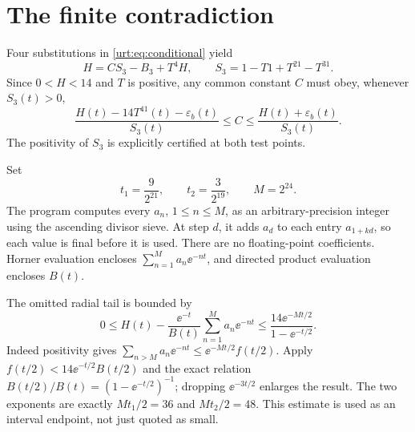 \documentclass[11pt,letterpaper]{article}
\theoremstyle{remark}\newtheorem{remark}[theorem]{Remark}
\begin{document}
\section{The finite contradiction}\label{urt:sec:contradiction}
Four substitutions in \eqref{urt:eq:conditional} yield
\begin{equation}\label{urt:eq:iterated}
 H=CS_3-B_3+T^4H,\qquad S_3=1-T1+T^21-T^31.
\end{equation}
Since $0<H<14$ and $T$ is positive, any common constant $C$ must obey, whenever $S_3(t)>0$,
\begin{equation}\label{urt:eq:Cinterval}
 \frac{H(t)-14T^41(t)-\varepsilon_b(t)}{S_3(t)}
 \le C\le
 \frac{H(t)+\varepsilon_b(t)}{S_3(t)}.
\end{equation}
The positivity of $S_3$ is explicitly certified at both test points.

Set
\begin{equation}\label{urt:eq:points}
 t_1=\frac9{2^{21}},\qquad t_2=\frac3{2^{19}},\qquad M=2^{24}.
\end{equation}
The program computes every $a_n$, $1\le n\le M$, as an arbitrary-precision integer using the ascending divisor sieve. At step $d$, it adds $a_d$ to each entry $a_{1+kd}$, so each value is final before it is used. There are no floating-point coefficients. Horner evaluation encloses $\sum_{n=1}^M a_n\ee^{-nt}$, and directed product evaluation encloses $B(t)$.

The omitted radial tail is bounded by
\begin{equation}\label{urt:eq:radialtail}
 0\le H(t)-\frac{\ee^{-t}}{B(t)}\sum_{n=1}^M a_n\ee^{-nt}
 \le\frac{14\ee^{-Mt/2}}{1-\ee^{-t/2}}.
\end{equation}
Indeed positivity gives $\sum_{n>M}a_n\ee^{-nt}\le\ee^{-Mt/2}f(t/2)$. Apply $f(t/2)<14\ee^{-t/2}B(t/2)$ and the exact relation $B(t/2)/B(t)=(1-\ee^{-t/2})^{-1}$; dropping $\ee^{-3t/2}$ enlarges the result. The two exponents are exactly $Mt_1/2=36$ and $Mt_2/2=48$. This estimate is used as an interval endpoint, not just quoted as small.
\end{document}
